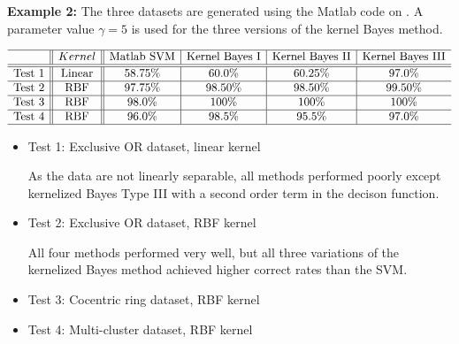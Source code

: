 \documentclass{article}
\begin{document}


{\bf Example 2:} The three datasets are generated using the Matlab
code on 
. 
A parameter value $\gamma=5$ is used for the three versions of the 
kernel Bayes method.

\begin{equation}
  \begin{array}{l||c||c|c|c|c} \hline
    & Kernel & \mbox{Matlab SVM} & \mbox{Kernel Bayes I} & \mbox{Kernel Bayes II} & \mbox{Kernel Bayes III}\\ \hline\hline
    \mbox{Test 1} & \mbox{Linear} & 58.75\% & 60.0\% & 60.25\% & 97.0\%\\\hline
    \mbox{Test 2} & \mbox{RBF} & 97.75\% & 98.50\% & 98.50\% & 99.50\%\\\hline
    \mbox{Test 3} & \mbox{RBF} & 98.0\% & 100\% & 100\% & 100\%\\\hline
    \mbox{Test 4} & \mbox{RBF} & 96.0\% & 98.5\% & 95.5\% & 97.0\%\\\hline
  \end{array}
\end{equation}

\begin{itemize}
\item Test 1: Exclusive OR dataset, linear kernel 

  As the data are not linearly separable, all methods performed poorly
  except kernelized Bayes Type III with a second order term in the 
  decison function. 


\item Test 2: Exclusive OR dataset, RBF kernel

  All four methods performed very well, but all three variations of
  the kernelized Bayes method achieved higher correct rates than
  the SVM.


\item Test 3: Cocentric ring dataset, RBF kernel
  

\item Test 4: Multi-cluster dataset, RBF kernel


\end{itemize}
\end{document}

